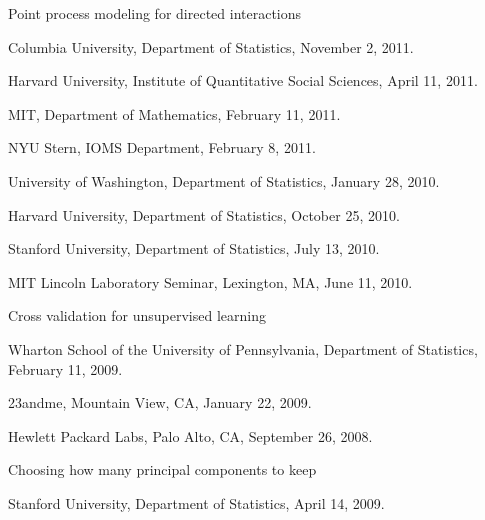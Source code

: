 \documentclass[10pt,letterpaper]{article}
\renewenvironment{itemize}{
  \begin{list}{}{
    \setlength{\leftmargin}{1.5em}
    \setlength{\itemsep}{0.25em}
    \setlength{\parskip}{0pt}
    \setlength{\parsep}{0.25em}
  }
}{
  \end{list}
}
\begin{document}
\begin{itemize}

\item Point process modeling for directed interactions
  \begin{itemize}
  \item Columbia University, Department of Statistics, November 2, 2011.
  \item Harvard University, Institute of Quantitative Social Sciences, April 11, 2011.
  \item MIT, Department of Mathematics, February 11, 2011.
  \item NYU Stern, IOMS Department, February 8, 2011.
  \item University of Washington, Department of Statistics, January 28, 2010.
  \item %
    Harvard University, Department of Statistics, October 25, 2010.
  \item %
    Stanford University, Department of Statistics, July 13, 2010.
  \item %
    MIT Lincoln Laboratory Seminar, Lexington, MA, June 11, 2010.
  \end{itemize}


\item Cross validation for unsupervised learning
  \begin{itemize}
    \item Wharton School of the University of Pennsylvania, Department of Statistics,
      February 11, 2009. 
    \item 23andme, Mountain View, CA, January 22, 2009.
    \item Hewlett Packard Labs, Palo Alto, CA, September 26, 2008.
  \end{itemize}

\item Choosing how many principal components to keep
  \begin{itemize}
    \item Stanford University, Department of Statistics, April 14, 2009.
  \end{itemize}

\end{itemize}
\end{document}
